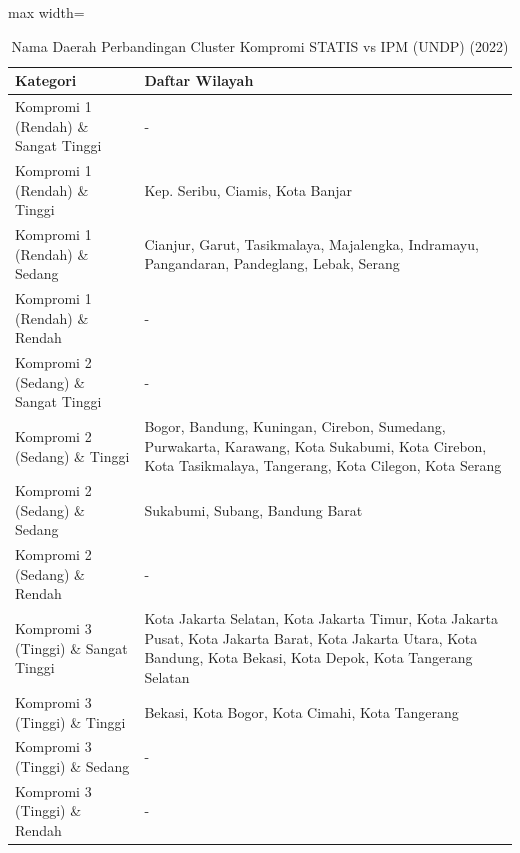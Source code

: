 \begin{table}[H]
\centering
\caption{Nama Daerah Perbandingan Cluster Kompromi STATIS vs IPM (UNDP) (2022)} \label{tab:app1comp_ipm_name_2022}
\begin{adjustbox}{max width=\textwidth}
\begin{tabular}{|p{4cm}|p{10cm}|}
\hline
\textbf{Kategori} & \textbf{Daftar Wilayah} \\
\hline
Kompromi 1 (Rendah) \& Sangat Tinggi & - \\
\hline
Kompromi 1 (Rendah) \& Tinggi & Kep. Seribu, Ciamis, Kota Banjar \\
\hline
Kompromi 1 (Rendah) \& Sedang & Cianjur, Garut, Tasikmalaya, Majalengka, Indramayu, Pangandaran, Pandeglang, Lebak, Serang \\
\hline
Kompromi 1 (Rendah) \& Rendah & - \\
\hline
Kompromi 2 (Sedang) \& Sangat Tinggi & - \\
\hline
Kompromi 2 (Sedang) \& Tinggi & Bogor, Bandung, Kuningan, Cirebon, Sumedang, Purwakarta, Karawang, Kota Sukabumi, Kota Cirebon, Kota Tasikmalaya, Tangerang, Kota Cilegon, Kota Serang \\
\hline
Kompromi 2 (Sedang) \& Sedang & Sukabumi, Subang, Bandung Barat \\
\hline
Kompromi 2 (Sedang) \& Rendah & - \\
\hline
Kompromi 3 (Tinggi) \& Sangat Tinggi & Kota Jakarta Selatan, Kota Jakarta Timur, Kota Jakarta Pusat, Kota Jakarta Barat, Kota Jakarta Utara, Kota Bandung, Kota Bekasi, Kota Depok, Kota Tangerang Selatan \\
\hline
Kompromi 3 (Tinggi) \& Tinggi & Bekasi, Kota Bogor, Kota Cimahi, Kota Tangerang \\
\hline
Kompromi 3 (Tinggi) \& Sedang & - \\
\hline
Kompromi 3 (Tinggi) \& Rendah & - \\
\hline
\end{tabular}
\end{adjustbox}
\end{table}